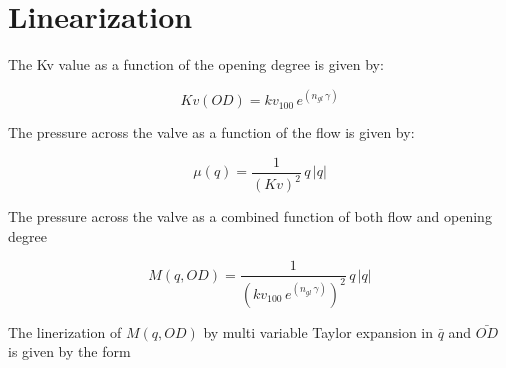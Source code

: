 \chapter{Linearization}
\label{chap:Lin}


The Kv value as a function of the opening degree is given by:

\begin{equation}
	Kv(OD)=kv_{100} \, e^{(n_{gl} \, \gamma)}
\end{equation}


The pressure across the valve as a function of the flow is given by:

\begin{equation}
	\mu(q)=\frac{1}{(Kv)^2} \, q \, |q|
\end{equation}


The pressure across the valve as a combined function of both flow and opening degree

\begin{equation}
	M(q,OD)=\frac{1}{(kv_{100} \, e^{(n_{gl} \, \gamma)})^2} \, q \, |q| 
\end{equation}	


The linerization of $M(q,OD)$ by multi variable Taylor expansion in $\bar{q}$ and $\bar{OD}$ is given by the form

